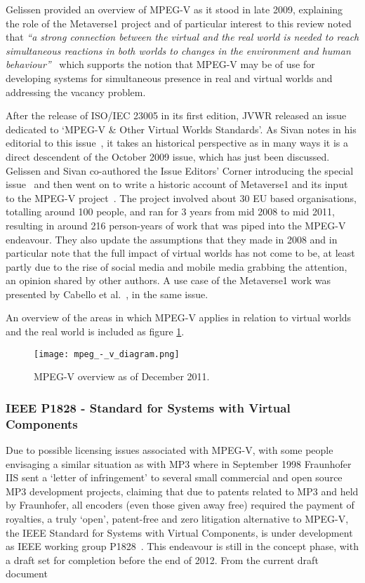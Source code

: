 Gelissen provided an overview of MPEG-V as it stood in late 2009, explaining the role of the Metaverse1 project and of particular interest to this review noted that \textit{``a strong connection between the virtual and the real world is needed to reach simultaneous reactions in both worlds to changes in the environment and human behaviour''}~\cite{Gelissen2009} which supports the notion that MPEG-V may be of use for developing systems for simultaneous presence in real and virtual worlds and addressing the vacancy problem.

After the release of ISO/IEC 23005 in its first edition, JVWR released an issue dedicated to `MPEG-V \& Other Virtual Worlds Standards'. As Sivan notes in his editorial to this issue~\cite{Sivan2011}, it takes an historical perspective as in many ways it is a direct descendent of the October 2009 issue, which has just  been discussed. Gelissen and Sivan co-authored the Issue Editors' Corner introducing the special issue~\cite{Gelissen2011} and then went on to write a historic account of Metaverse1 and its input to the MPEG-V project~\cite{Gelissen2011a}. The project involved about 30 EU based organisations, totalling around 100 people, and ran for 3 years from mid 2008 to mid 2011, resulting in around 216 person-years of work that was piped into the MPEG-V endeavour. They also update the assumptions that they made in 2008 and in particular note that the full impact of virtual worlds has not come to be, at least partly due to the rise of social media and mobile media grabbing the attention, an opinion shared by other authors. A use case of the Metaverse1 work was presented by Cabello et al.~\cite{Cabello2011}, in the same issue.

An overview of the areas in which MPEG-V applies in relation to virtual worlds and the real world is included as figure \ref{mpeg_-_v_diagram.png}.

\begin{figure}[h]
\centering
\texttt{[image: mpeg\_-\_v\_diagram.png]}
\caption{MPEG-V overview as of December 2011.}
\label{mpeg_-_v_diagram.png}
\end{figure}


\subsubsection{IEEE P1828 - Standard for Systems with Virtual Components}
Due to possible licensing issues associated with MPEG-V, with some people envisaging a similar situation as with MP3 where in September 1998 Fraunhofer IIS sent a `letter of infringement' to several small commercial and open source MP3 development projects, claiming that due to patents related to MP3 and held by Fraunhofer, all encoders (even those given away free) required the payment of royalties, a truly `open', patent-free and zero litigation alternative to MPEG-V, the IEEE Standard for Systems with Virtual Components, is under development as IEEE working group P1828~\cite{IEEE}. This endeavour is still in the concept phase, with a draft set for completion before the end of 2012. From the current draft document

